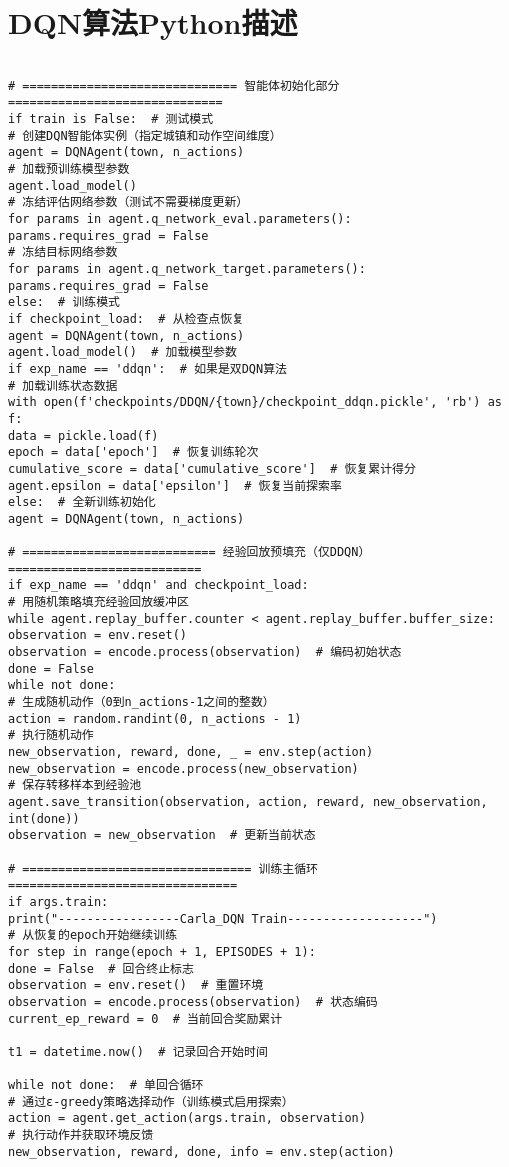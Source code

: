 \section{DQN算法Python描述}
\begin{lstlisting}
	
# ============================== 智能体初始化部分 ==============================
if train is False:  # 测试模式
# 创建DQN智能体实例（指定城镇和动作空间维度）
agent = DQNAgent(town, n_actions)
# 加载预训练模型参数
agent.load_model()
# 冻结评估网络参数（测试不需要梯度更新）
for params in agent.q_network_eval.parameters():
params.requires_grad = False
# 冻结目标网络参数
for params in agent.q_network_target.parameters():
params.requires_grad = False
else:  # 训练模式
if checkpoint_load:  # 从检查点恢复
agent = DQNAgent(town, n_actions)
agent.load_model()  # 加载模型参数
if exp_name == 'ddqn':  # 如果是双DQN算法
# 加载训练状态数据
with open(f'checkpoints/DDQN/{town}/checkpoint_ddqn.pickle', 'rb') as f:
data = pickle.load(f)
epoch = data['epoch']  # 恢复训练轮次
cumulative_score = data['cumulative_score']  # 恢复累计得分
agent.epsilon = data['epsilon']  # 恢复当前探索率
else:  # 全新训练初始化
agent = DQNAgent(town, n_actions)

# =========================== 经验回放预填充（仅DDQN） ===========================
if exp_name == 'ddqn' and checkpoint_load:
# 用随机策略填充经验回放缓冲区
while agent.replay_buffer.counter < agent.replay_buffer.buffer_size:
observation = env.reset()
observation = encode.process(observation)  # 编码初始状态
done = False
while not done:
# 生成随机动作（0到n_actions-1之间的整数）
action = random.randint(0, n_actions - 1)
# 执行随机动作
new_observation, reward, done, _ = env.step(action)
new_observation = encode.process(new_observation)
# 保存转移样本到经验池
agent.save_transition(observation, action, reward, new_observation, int(done))
observation = new_observation  # 更新当前状态

# ================================ 训练主循环 ================================
if args.train:
print("-----------------Carla_DQN Train-------------------")
# 从恢复的epoch开始继续训练
for step in range(epoch + 1, EPISODES + 1):
done = False  # 回合终止标志
observation = env.reset()  # 重置环境
observation = encode.process(observation)  # 状态编码
current_ep_reward = 0  # 当前回合奖励累计

t1 = datetime.now()  # 记录回合开始时间

while not done:  # 单回合循环
# 通过ε-greedy策略选择动作（训练模式启用探索）
action = agent.get_action(args.train, observation)
# 执行动作并获取环境反馈
new_observation, reward, done, info = env.step(action)


\end{lstlisting}
